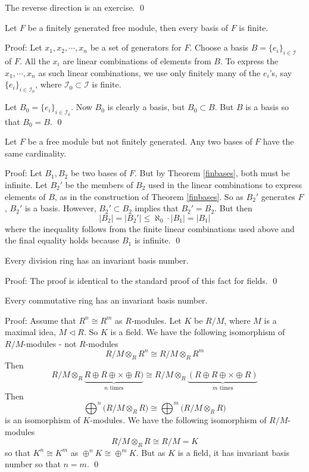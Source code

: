 The reverse direction is an exercise. \qed \\

\begin{thm} \label{finbases}
Let $F$ be a finitely generated free module, then every basis of $F$ is finite. 
\end{thm}

Proof: Let $x_1,x_2,\cdots,x_n$ be a set of generators for $F$. Choose a basis $B=\{e_i\}_{i \in \mathcal{I}}$ of $F$. All the $x_i$ are linear combinations of elements from $B$. To express the $x_1,\cdots,x_n$ as such linear combinations, we use only finitely many of the $e_i$'s, say $\{e_i\}_{i \in \mathcal{I}_0}$, where $\mathcal{I}_0 \subset \mathcal{I}$ is finite. 

Let $B_0=\{e_i\}_{i \in \mathcal{I}_0}$. Now $B_0$ is clearly a basis, but $B_0 \subset B$. But $B$ is a basis so that $B_0=B$. \qed \\

\begin{thm}
Let $F$ be a free module but not finitely generated. Any two bases of $F$ have the same cardinality. 
\end{thm}

Proof: Let $B_1,B_2$ be two bases of $F$. But by Theorem \ref{finbases}, both must be infinite. Let $B_2'$ be the members of $B_2$ used in the linear combinations to express elements of $B$, as in the construction of Theorem \ref{finbases}. So as $B_2'$ generates $F$, $B_2'$ is a basis. However, $B_2' \subset B_2$ implies that $B_2'=B_2$. But then 
\[
|B_2|=|B_2'| \leq \aleph_0 \cdot |B_1|=|B_1|
\]
where the inequality follows from the finite linear combinations used above and the final equality holds because $B_1$ is infinite. \qed \\

\begin{thm}
Every division ring has an invariant basis number.
\end{thm}

Proof: The proof is identical to the standard proof of this fact for fields. \qed \\

\begin{thm}
Every commutative ring has an invariant basis number. 
\end{thm}

Proof: Assume that $R^n \cong R^m$ as $R$-modules. Let $K$ be $R/M$, where $M$ is a maximal idea, $M \lhd R$. So $K$ is a field. We have the following isomorphism of $R/M$-modules - not $R$-modules
\[
R/M \otimes_R R^n \cong R/M \otimes_R R^m
\]
Then
\[
R/M \otimes_R \underbrace{R \oplus R \oplus \times \oplus R)}_{n \text{ times}} \cong R/M \otimes_R \underbrace{(R \oplus R \oplus \times \oplus R)}_{m \text{ times}}
\]
Then
\[
\bigoplus^n \bigg( R/M \otimes_R R \bigg) \cong \bigoplus^m \bigg(R/M \otimes_R R\bigg)
\]
is an isomorphism of $K$-modules. We have the following isomorphism of $R/M$-modules
\[
R/M \otimes_R R \cong R/M=K
\]
so that $K^n \cong K^m$ as $\oplus^n K \cong \oplus^m K$. But as $K$ is a field, it has invariant basis number so that $n=m$. \qed \\

